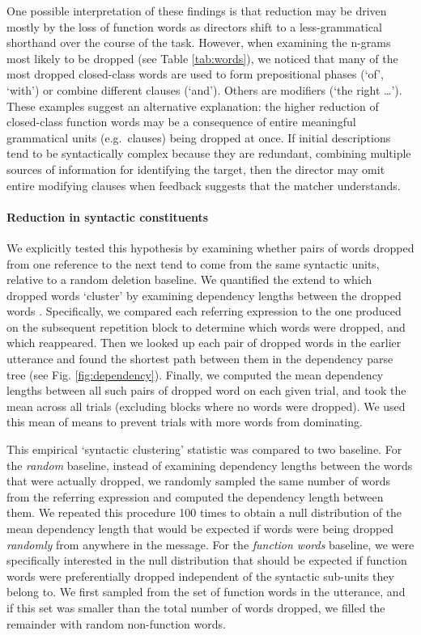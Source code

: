 \documentclass[alpha-refs]{wiley-article}
\begin{document}
One possible interpretation of these findings is that reduction may be driven mostly by the loss of function words as directors shift to a less-grammatical shorthand over the course of the task.
However, when examining the n-grams most likely to be dropped (see Table \ref{tab:words}), we noticed that many of the most dropped closed-class words are used to  form prepositional phases (`of', `with') or combine different clauses (`and'). 
Others are modifiers (`the right \dots'). 
These examples suggest an alternative explanation: the higher reduction of closed-class function words may be a consequence of entire meaningful grammatical units (e.g.~clauses) being dropped at once.
If initial descriptions tend to be syntactically complex because they are redundant, combining multiple sources of information for identifying the target, then the director may omit entire modifying clauses when feedback suggests that the matcher understands.

\paragraph{Reduction in syntactic constituents} 
We explicitly tested this hypothesis by examining whether pairs of words dropped from one reference to the next tend to come from the same syntactic units, relative to a random deletion baseline.
We quantified the extend to which dropped words `cluster' by examining dependency lengths between the dropped words \citep{jurafsky2014speech,futrell2015large}.
Specifically, we compared each referring expression to the one produced on the subsequent repetition block to determine which words were dropped, and which reappeared.
Then we looked up each pair of dropped words in the earlier utterance and found the shortest path between them in the dependency parse tree (see Fig. \ref{fig:dependency}).
Finally, we computed the mean dependency lengths between all such pairs of dropped word on each given trial, and took the mean across all trials (excluding blocks where no words were dropped). 
We used this mean of means to prevent trials with more words from dominating.

This empirical `syntactic clustering' statistic was compared to two baseline.
For the \emph{random} baseline, instead of examining dependency lengths between the words that were actually dropped, we randomly sampled the same number of words from the referring expression and computed the dependency length between them.
We repeated this procedure 100 times to obtain a null distribution of the mean dependency length that would be expected if words were being dropped \emph{randomly} from anywhere in the message.
For the \emph{function words} baseline, we were specifically interested in the null distribution that should be expected if function words were preferentially dropped independent of the syntactic sub-units they belong to.
We first sampled from the set of function words in the utterance, and if this set was smaller than the total number of words dropped, we filled the remainder with random non-function words. 
\end{document}
